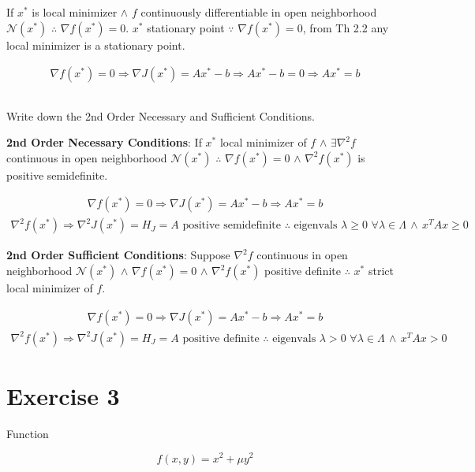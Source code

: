 \documentclass[unicode,11pt,a4paper,oneside,numbers=endperiod,openany]{scrartcl}
\newcommand{\myex}[1]{\begin{equation*}\begin{aligned} #1 \end{aligned}\end{equation*}}
\begin{document}
If $x^*$ is local minimizer 
$\land$ $f$ continuously differentiable in open neighborhood $\mathcal{N}(x^*)$ 
$\therefore$ $\nabla f(x^*) = 0$. 
$x^*$ stationary point $\because$ $\nabla f(x^*) = 0$, 
from Th 2.2 any local minimizer is a stationary point.

\myex{
    \nabla f(x^*) = 0 
    \Rightarrow \nabla J(x^*) = A x^* - b
    \Rightarrow A x^* - b = 0
    \Rightarrow A x^* = b
}

\subsection{}
Write down the 2nd Order Necessary and Sufficient Conditions. \newline

\textbf{2nd Order Necessary Conditions}:
If $x^*$ local minimizer of $f$ 
$\land$ $\exists \nabla^2 f$ continuous in open neighborhood $\mathcal{N}(x^*)$ 
$\therefore$ $\nabla f(x^*) = 0$ 
$\land$ $\nabla^2 f(x^*)$ is positive semidefinite.

\myex{
    \nabla f(x^*) = 0
    \Rightarrow \nabla J(x^*) = A x^* - b
    \Rightarrow A x^* = b
}
\myex{
    \nabla^2 f(x^*)
    \Rightarrow \nabla^2 J(x^*) = H_J = A \text{ positive semidefinite } 
    \therefore \text{ eigenvals } \lambda \geq 0 \,\, \forall \lambda \in \Lambda \,
    \land \, x^T A x \geq 0
}
\newline

\textbf{2nd Order Sufficient Conditions}:
Suppose $\nabla^2 f$ continuous in open neighborhood $\mathcal{N}(x^*)$ 
$\land$ $\nabla f(x^*) = 0$ 
$\land$ $\nabla^2 f(x^*)$ positive definite
$\therefore$ $x^*$ strict local minimizer of $f$.

\myex{
    \nabla f(x^*) = 0
    \Rightarrow \nabla J(x^*) = A x^* - b
    \Rightarrow A x^* = b
}
\myex{
    \nabla^2 f(x^*)
    \Rightarrow \nabla^2 J(x^*) = H_J = A \text{ positive definite } 
    \therefore \text{ eigenvals } \lambda > 0 \,\, \forall \lambda \in \Lambda \,
    \land \, x^T A x > 0
}

\section{Exercise 3}
Function

\begin{equation}
    f(x, y) = x^2 + \mu y^2
\end{equation}
\end{document}
